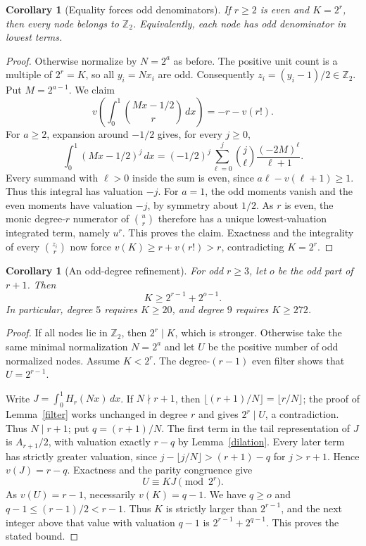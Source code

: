 \documentclass[11pt]{article}
\newtheorem{corollary}[theorem]{Corollary}
\newcommand{\Z}{\mathbb Z}
\begin{document}
\begin{corollary}[Equality forces odd denominators]\label{equality}
If $r\ge2$ is even and $K=2^r$, then every node belongs to $\Z_2$.
Equivalently, each node has odd denominator in lowest terms.
\end{corollary}
\begin{proof}
Otherwise normalize by $N=2^a$ as before. The positive unit count is
a multiple of $2^r=K$, so all $y_i=Nx_i$ are odd. Consequently
$z_i=(y_i-1)/2\in\Z_2$.
Put $M=2^{a-1}$. We claim
\[
 v\left(\int_0^1\binom{Mx-1/2}{r}\,dx\right)
 =-r-v(r!).
\]
For $a\ge2$, expansion around $-1/2$ gives, for every $j\ge0$,
\[
 \int_0^1(Mx-1/2)^j\,dx
 =(-1/2)^j\sum_{\ell=0}^j
       \binom j\ell\frac{(-2M)^\ell}{\ell+1}.
\]
Every summand with $\ell>0$ inside the sum is even, since
$a\ell-v(\ell+1)\ge1$. Thus this integral has valuation $-j$.
For $a=1$, the odd moments vanish and the even moments have valuation
$-j$, by symmetry about $1/2$.
As $r$ is even, the monic degree-$r$ numerator of
$\binom ur$ therefore has a unique lowest-valuation integrated term,
namely $u^r$. This proves the claim.
Exactness and the integrality of every $\binom{z_i}{r}$ now force
$v(K)\ge r+v(r!)>r$, contradicting $K=2^r$.
\end{proof}

\begin{corollary}[An odd-degree refinement]\label{odd}
For odd $r\ge3$, let $o$ be the odd part of $r+1$. Then
\[
 K\ge 2^{r-1}+2^{o-1}.
\]
In particular, degree $5$ requires $K\ge20$, and degree $9$ requires
$K\ge272$.
\end{corollary}
\begin{proof}
If all nodes lie in $\Z_2$, then $2^r\mid K$, which is stronger.
Otherwise take the same minimal normalization $N=2^a$ and let $U$ be
the positive number of odd normalized nodes. Assume $K<2^r$.
The degree-$(r-1)$ even filter shows that $U=2^{r-1}$.

Write $J=\int_0^1H_r(Nx)\,dx$. If $N\nmid r+1$, then
$\lfloor(r+1)/N\rfloor=\lfloor r/N\rfloor$; the proof of
Lemma~\ref{filter} works unchanged in degree $r$ and gives
$2^r\mid U$, a contradiction. Thus $N\mid r+1$; put $q=(r+1)/N$.
The first term in the tail representation of $J$ is
$A_{r+1}/2$, with valuation exactly $r-q$ by Lemma~\ref{dilation}.
Every later term has strictly greater valuation, since
$j-\lfloor j/N\rfloor>(r+1)-q$ for $j>r+1$.
Hence $v(J)=r-q$. Exactness and the parity congruence give
\[
 U\equiv KJ\pmod{2^r}.
\]
As $v(U)=r-1$, necessarily $v(K)=q-1$.
We have $q\ge o$ and $q-1\le(r-1)/2<r-1$. Thus $K$ is strictly
larger than $2^{r-1}$, and the next integer above that value with
valuation $q-1$ is $2^{r-1}+2^{q-1}$. This proves the stated bound.
\end{proof}
\end{document}
